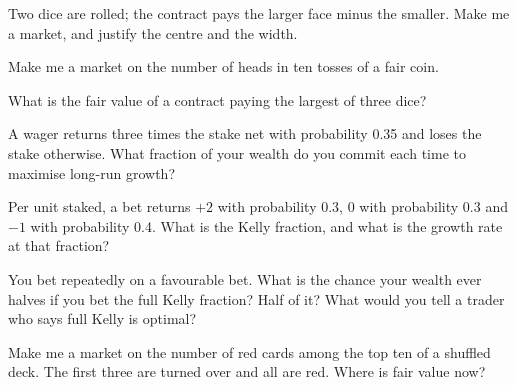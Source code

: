 \begin{interviewq}\label{iq:iv:betting-and-market-making-games:3}
Two dice are rolled; the contract pays the larger face minus the smaller. Make me a market, and justify the centre and
the width.
\end{interviewq}

\begin{interviewq}\label{iq:iv:betting-and-market-making-games:4}
Make me a market on the number of heads in ten tosses of a fair coin.
\end{interviewq}

\begin{interviewq}\label{iq:iv:betting-and-market-making-games:5}
What is the fair value of a contract paying the largest of three dice?
\end{interviewq}

\begin{interviewq}\label{iq:iv:betting-and-market-making-games:6}
A wager returns three times the stake net with probability 0.35 and loses the stake otherwise. What fraction of your
wealth do you commit each time to maximise long-run growth?
\end{interviewq}

\begin{interviewq}\label{iq:iv:betting-and-market-making-games:7}
Per unit staked, a bet returns $+2$ with probability 0.3, 0 with probability 0.3 and $-1$ with probability 0.4.
What is the Kelly fraction, and what is the growth rate at that fraction?
\end{interviewq}

\begin{interviewq}\label{iq:iv:betting-and-market-making-games:8}
You bet repeatedly on a favourable bet. What is the chance your wealth ever halves if you bet the full Kelly
fraction? Half of it? What would you tell a trader who says full Kelly is optimal?
\end{interviewq}

\begin{interviewq}\label{iq:iv:betting-and-market-making-games:9}
Make me a market on the number of red cards among the top ten of a shuffled deck. The first three are turned over
and all are red. Where is fair value now?
\end{interviewq}

